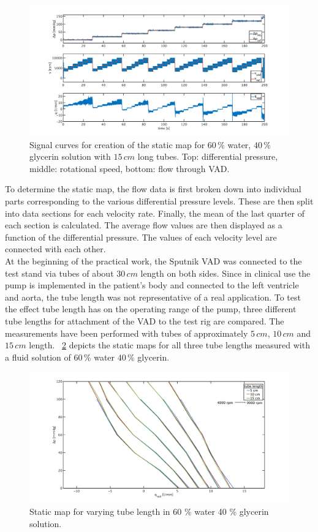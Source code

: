 \begin{figure}[ht]
  \centering
  \includegraphics[width=\textwidth]{images/chapt_4/Test_60w40g_long.pdf}
  \caption[Signal curves for creation of the static map.]{Signal curves for creation of the static map for $60\,\%$ water, $40\,\%$ glycerin solution with $15 \, cm$ long tubes. Top: differential pressure, middle: rotational speed, bottom: flow through VAD.}
  \label{fig:test_60w40g_long}
\end{figure}
To determine the static map, the flow data is first broken down into individual parts corresponding to the various differential pressure levels.  These are then split into data sections for each velocity rate. Finally, the mean of the last quarter of each section is calculated. The average flow values are then displayed as a function of the differential pressure. The values of each velocity level are connected with each other.
\\At the beginning of the practical work, the Sputnik VAD was connected to the test stand via tubes of about $30\, cm$ length on both sides. Since in clinical use the pump is implemented in the patient's body and connected to the left ventricle and aorta, the tube length was not representative of a real application. To test the effect tube length has on the operating range of the pump, three different tube lengths for attachment of the VAD to the test rig are compared. The measurements have been performed with tubes of approximately $5\, cm$, $10\, cm$ and $15\, cm$ length. \figurename~\ref{fig:60w_40g} depicts the static maps for all three tube lengths measured with a fluid solution of $60\, \%$ water $40\, \%$ glycerin.
\begin{figure}[ht]
  \centering
  \includegraphics[width=\textwidth]{images/chapt_4/60w40g_tube_length_new.pdf}
  \caption[Static map for different tube length in 60 \% water 40 \% glycerin solution]{Static map for varying tube length in 60 \% water 40 \% glycerin solution.}
  \label{fig:60w_40g}
\end{figure}
